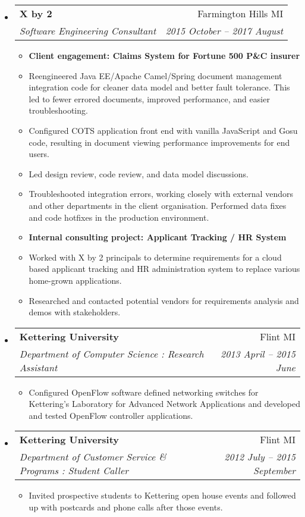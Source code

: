\documentclass[letterpaper,10pt]{article}
\makeatletter
\newcommand{\resitem}[1]{\item #1 \vspace{-2pt}}
\newcommand{\ressubheading}[4]{
\begin{tabular*}{6.5in}{l@{\cftdotfill{\cftsecdotsep}\extracolsep{\fill}}r}
        \textbf{#1} & #2 \\
        \textit{#3} & \textit{#4} \\
\end{tabular*}\vspace{-6pt}}
\makeatother
\begin{document}
\begin{itemize}

\item
\ressubheading{X by 2}{Farmington Hills MI}{Software Engineering Consultant}{2015 October -- 2017 August}
\begin{itemize}\small
    \resitem{{\bf Client engagement: Claims System for Fortune 500 P\&C insurer}}
    \resitem{Reengineered Java EE/Apache Camel/Spring document management integration code for cleaner data model 
    	     and better fault tolerance. This led to fewer errored documents, improved performance, and easier troubleshooting.}
    \resitem{Configured COTS application front end with vanilla JavaScript and Gosu code, resulting in document viewing 
    	     performance improvements for end users.}
    \resitem{Led design review, code review, and data model discussions.}
    \resitem{Troubleshooted integration errors, working closely with external vendors and other departments in the client 
    	     organisation. Performed data fixes and code hotfixes in the production environment.}
    \resitem{{\bf Internal consulting project: Applicant Tracking / HR System}}
    \resitem{Worked with X by 2 principals to determine requirements for a cloud based applicant tracking
             and HR administration system to replace various home-grown applications.}
    \resitem{Researched and contacted potential vendors for requirements analysis and demos with stakeholders.}
\end{itemize}

\item
\ressubheading{Kettering University}{Flint MI}{Department of Computer Science : Research Assistant}{2013 April -- 2015 June}
\begin{itemize}\small
    \resitem{Configured OpenFlow software defined networking switches for Kettering's 
    	     Laboratory for Advanced Network Applications and developed and tested OpenFlow controller applications.}
\end{itemize}

\iffalse
\item
\ressubheading{Kettering University}{Flint MI}{Department of Customer Service \& Programs : Student Caller}{2012 July -- 2015 September}
\begin{itemize}\small
    \resitem{Invited prospective students to Kettering open house events and followed up with postcards 
             and phone calls after those events.}
\end{itemize}


\end{itemize}
\end{document}
